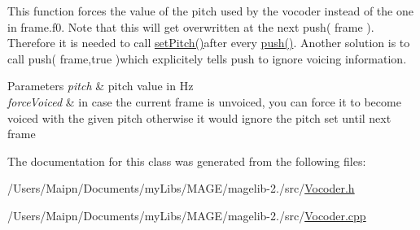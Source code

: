 This function forces the value of the pitch used by the vocoder instead of the one in frame.\-f0. Note that this will get overwritten at the next push( frame ). Therefore it is needed to call \hyperlink{class_m_a_g_e_1_1_vocoder_ad0010897fe2f1b7ff08ff765b2c315b9}{set\-Pitch()}after every \hyperlink{class_m_a_g_e_1_1_vocoder_a090b14af5e7371412ebee3829808f2de}{push()}. Another solution is to call push( frame,true )which explicitely tells push to ignore voicing information.


\begin{DoxyParams}{Parameters}
{\em pitch} & pitch value in Hz \\
\hline
{\em force\-Voiced} & in case the current frame is unvoiced, you can force it to become voiced with the given pitch otherwise it would ignore the pitch set until next frame \\
\hline
\end{DoxyParams}


The documentation for this class was generated from the following files\-:\begin{DoxyCompactItemize}
\item 
/\-Users/\-Maipn/\-Documents/my\-Libs/\-M\-A\-G\-E/magelib-\/2./src/\hyperlink{_vocoder_8h}{Vocoder.\-h}\item 
/\-Users/\-Maipn/\-Documents/my\-Libs/\-M\-A\-G\-E/magelib-\/2./src/\hyperlink{_vocoder_8cpp}{Vocoder.\-cpp}\end{DoxyCompactItemize}
